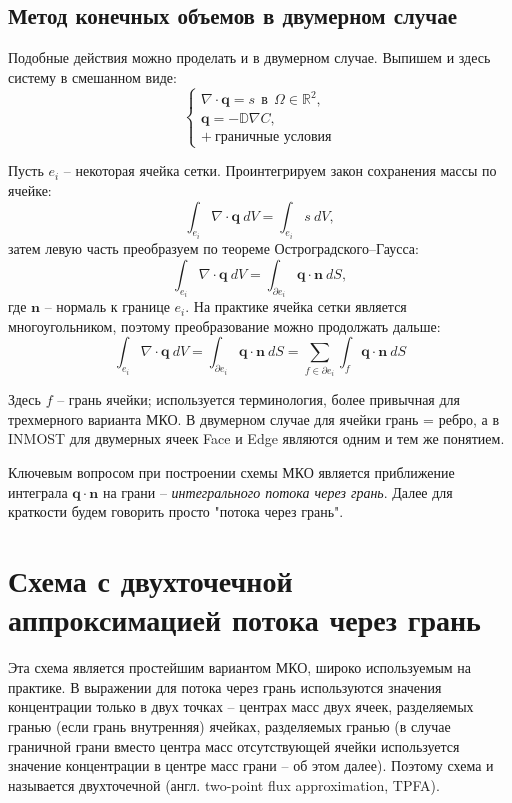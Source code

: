 \documentclass[a4paper, 11pt]{article}
\begin{document}
\subsection{Метод конечных объемов в двумерном случае}

Подобные действия можно проделать и в двумерном случае. Выпишем и здесь систему в смешанном виде:
\begin{equation}
\begin{cases}
\nabla\cdot\mathbf{q} = s~~\text{в}~~\Omega\in\mathbb{R}^2,\\
\mathbf{q} = - \mathbb{D}\nabla C,\\
+~\text{граничные условия}
\end{cases}
\end{equation}

Пусть $e_i$ -- некоторая ячейка сетки. Проинтегрируем закон сохранения массы по ячейке:
\begin{equation}
\int_{e_i}\nabla\cdot\mathbf{q}~dV = \int_{e_i}s~dV,
\end{equation}
затем левую часть преобразуем по теореме Остроградского--Гаусса:
\begin{equation}
\int_{e_i}\nabla\cdot\mathbf{q}~dV = \int_{\partial e_i}\mathbf{q}\cdot\mathbf{n}~dS,
\end{equation}
где $\mathbf{n}$ -- нормаль к границе $e_i$. На практике ячейка сетки является многоугольником, поэтому преобразование можно продолжать дальше:
\begin{equation}
\int_{e_i}\nabla\cdot\mathbf{q}~dV = \int_{\partial e_i}\mathbf{q}\cdot\mathbf{n}~dS 
= 
\sum_{f \in \partial e_i} \int_{f}\mathbf{q}\cdot\mathbf{n} ~dS
\end{equation}

Здесь $f$ -- грань ячейки; используется терминология, более привычная для трехмерного варианта МКО. В двумерном случае для ячейки грань = ребро, а в INMOST для двумерных ячеек Face и Edge являются одним и тем же понятием.

Ключевым вопросом при построении схемы МКО является приближение интеграла $\mathbf{q}\cdot\mathbf{n}$ на грани -- \textit{интегрального потока через грань}. Далее для краткости будем говорить просто "потока через грань".

\section{Схема с двухточечной аппроксимацией потока через грань}

Эта схема является простейшим вариантом МКО, широко используемым на практике. В выражении для потока через грань используются значения концентрации только в двух точках -- центрах масс двух ячеек, разделяемых гранью (если грань внутренняя) ячейках, разделяемых гранью (в случае граничной грани вместо центра масс отсутствующей ячейки используется значение концентрации в центре масс грани -- об этом далее). Поэтому схема и называется двухточечной (англ. two-point flux approximation, TPFA).
\end{document}
